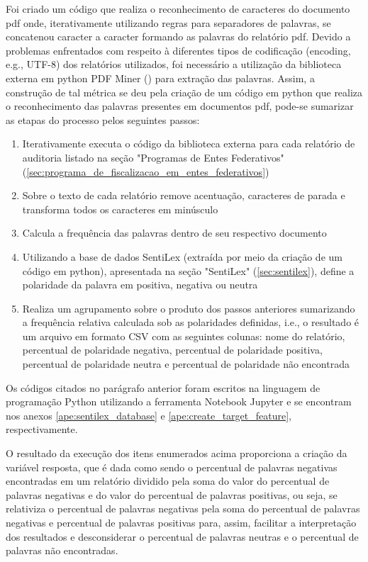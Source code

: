 Foi criado um código que realiza o reconhecimento de caracteres do documento pdf onde, iterativamente utilizando regras para separadores de palavras, se concatenou caracter a caracter formando as palavras do relatório pdf. Devido a problemas enfrentados com respeito à diferentes tipos de codificação (encoding, e.g., UTF-8) dos relatórios utilizados, foi necessário a utilização da biblioteca externa em python PDF Miner (\citet{PDFMiner}) para extração das palavras. Assim, a construção de tal métrica se deu pela criação de um código em python que realiza o reconhecimento das palavras presentes em documentos pdf, pode-se sumarizar as etapas do processo pelos seguintes passos:

\begin{enumerate}
	\item Iterativamente executa o código da biblioteca externa para cada relatório de auditoria listado na seção "Programas de Entes Federativos" (\ref{sec:programa_de_fiscalizacao_em_entes_federativos})
	\item Sobre o texto de cada relatório remove acentuação, caracteres de parada e transforma todos os caracteres em minúsculo
	\item Calcula a frequência das palavras dentro de seu respectivo documento
	\item Utilizando a base de dados SentiLex (extraída por meio da criação de um código em python), apresentada na seção "SentiLex" (\ref{sec:sentilex}), define a polaridade da palavra em positiva, negativa ou neutra
	\item Realiza um agrupamento sobre o produto dos passos anteriores sumarizando a frequência relativa calculada sob as polaridades definidas, i.e., o resultado é um arquivo em formato CSV com as seguintes colunas: nome do relatório, percentual de polaridade negativa, percentual de polaridade positiva, percentual de polaridade neutra e percentual de polaridade não encontrada
\end{enumerate}

Os códigos citados no parágrafo anterior foram escritos na linguagem de programação Python utilizando a ferramenta Notebook Jupyter e se encontram nos anexos \ref{ape:sentilex_database} e \ref{ape:create_target_feature}, respectivamente.

O resultado da execução dos itens enumerados acima proporciona a criação da variável resposta, que é dada como sendo o percentual de palavras negativas encontradas em um relatório dividido pela soma do valor do percentual de palavras negativas e do valor do percentual de palavras positivas, ou seja, se relativiza o percentual de palavras negativas pela soma do percentual de palavras negativas e percentual de palavras positivas para, assim, facilitar a interpretação dos resultados e desconsiderar o percentual de palavras neutras e o percentual de palavras não encontradas.

